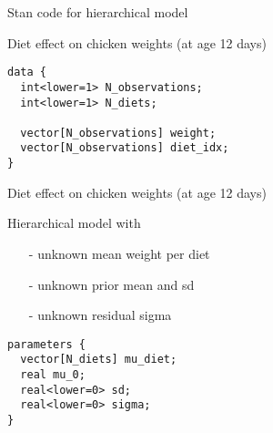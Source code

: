 \documentclass[finnish,english,t]{beamer}
\begin{document}

  


  

\begin{frame}[fragile]{Stan code for hierarchical model}

Diet effect on chicken weights (at age 12 days)
  
{\small
\begin{verbatim}
data {
  int<lower=1> N_observations;
  int<lower=1> N_diets;

  vector[N_observations] weight;
  vector[N_observations] diet_idx;
}
\end{verbatim}
}

\end{frame}

\begin{frame}[fragile]{Diet effect on chicken weights (at age 12 days)}

Hierarchical model with
    \begin{itemize}
    \item[-] unknown mean weight per diet
    \item[-] unknown prior mean and sd
    \item[-] unknown residual sigma
    \end{itemize}
  
{\small\begin{verbatim}
parameters {
  vector[N_diets] mu_diet;
  real mu_0;
  real<lower=0> sd;
  real<lower=0> sigma;
}
\end{verbatim}
}

\end{frame}
\end{document}
